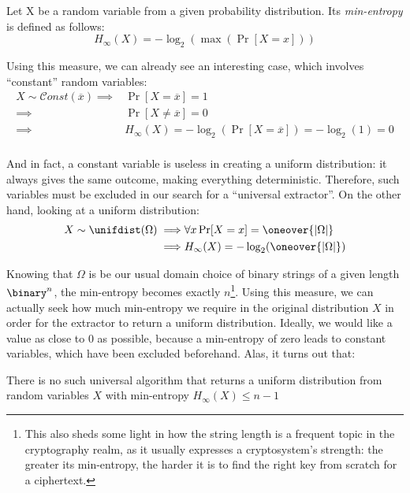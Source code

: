 \begin{definition} Let X be a random variable from a given probability distribution. Its \emph{min-entropy} is defined as follows:
\[
    H_{\infty}(X) = -\log_2(\max(\Pr[X = x]))
\]
\end{definition}

Using this measure, we can already see an interesting case, which involves ``constant'' random variables:
\begin{align*}
    X \sim \mathcal{C}onst(\overline{x}) \implies & \Pr[X = \overline{x}] = 1                                       \\
                                         \implies & \Pr[X \neq \overline{x}] = 0                                    \\
                                         \implies & H_{\infty}(X) = -\log_2(\Pr[X = \overline{x}]) = -\log_2(1) = 0 \\
\end{align*}

And in fact, a constant variable is useless in creating a uniform distribution: it always gives the same outcome, making everything deterministic. Therefore, such variables must be excluded in our search for a ``universal extractor''.
On the other hand, looking at a uniform distribution:
\begin{align*}
    X \sim \unifdist(\Omega) \implies & \forall x \Pr[X = x] = \oneover{|\Omega|}   \\
                             \implies & H_{\infty}(X) = -\log_2(\oneover{|\Omega|})
\end{align*}

Knowing that $\Omega$ is be our usual domain choice of binary strings of a given length $\binary^n$, the min-entropy becomes exactly $n$\footnote{This also sheds some light in how the string length is a frequent topic in the cryptography realm, as it usually expresses a cryptosystem's strength: the greater its min-entropy, the harder it is to find the right key from scratch for a ciphertext.}.
Using this measure, we can actually seek how much min-entropy we require in the original distribution $X$ in order for the extractor to return a uniform distribution. Ideally, we would like a value as close to 0 as possible, because a min-entropy of zero leads to constant variables, which have been excluded beforehand. Alas, it turns out that:
\begin{claim}
    There is no such universal \ext{} algorithm that returns a uniform distribution from random variables $X$ with min-entropy $H_{\infty}(X) \leq n - 1$
\end{claim}

